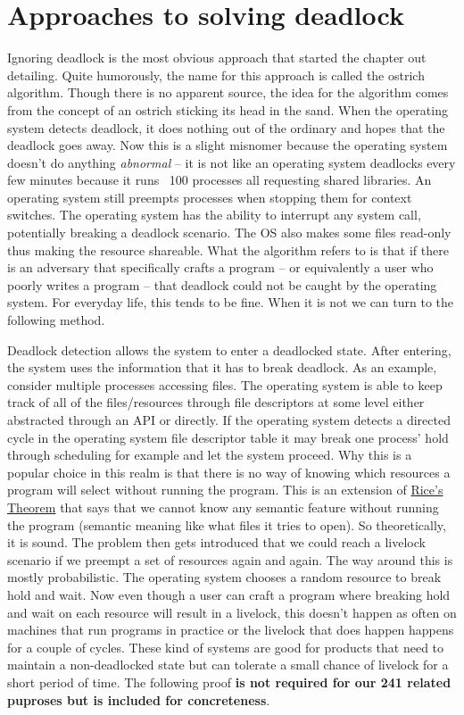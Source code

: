\section{Approaches to solving deadlock}

Ignoring deadlock is the most obvious approach that started the chapter out detailing. Quite humorously, the name for this approach is called the ostrich algorithm. Though there is no apparent source, the idea for the algorithm comes from the concept of an ostrich sticking its head in the sand. When the operating system detects deadlock, it does nothing out of the ordinary and hopes that the deadlock goes away. Now this is a slight misnomer because the operating system doesn't do anything \textit{abnormal} -- it is not like an operating system deadlocks every few minutes because it runs ~100 processes all requesting shared libraries. An operating system still preempts processes when stopping them for context switches. The operating system has the ability to interrupt any system call, potentially breaking a deadlock scenario. The OS also makes some files read-only thus making the resource shareable. What the algorithm refers to is that if there is an adversary that specifically crafts a program -- or equivalently a user who poorly writes a program -- that deadlock could not be caught by the operating system. For everyday life, this tends to be fine. When it is not we can turn to the following method.

Deadlock detection allows the system to enter a deadlocked state. After entering, the system uses the information that it has to break deadlock. As an example, consider multiple processes accessing files. The operating system is able to keep track of all of the files/resources through file descriptors at some level either abstracted through an API or directly. If the operating system detects a directed cycle in the operating system file descriptor table it may break one process' hold through scheduling for example and let the system proceed. Why this is a popular choice in this realm is that there is no way of knowing which resources a program will select without running the program. This is an extension of \href{https://www.jstor.org/stable/1990888?seq=1#page_scan_tab_contents}{Rice's Theorem} \cite{CITATION_NEEDED} that says that we cannot know any semantic feature without running the program (semantic meaning like what files it tries to open). So theoretically, it is sound. The problem then gets introduced that we could reach a livelock scenario if we preempt a set of resources again and again. The way around this is mostly probabilistic. The operating system chooses a random resource to break hold and wait. Now even though a user can craft a program where breaking hold and wait on each resource will result in a livelock, this doesn't happen as often on machines that run programs in practice or the livelock that does happen happens for a couple of cycles. These kind of systems are good for products that need to maintain a non-deadlocked state but can tolerate a small chance of livelock for a short period of time. The following proof \textbf{is not required for our 241 related puproses but is included for concreteness}.


